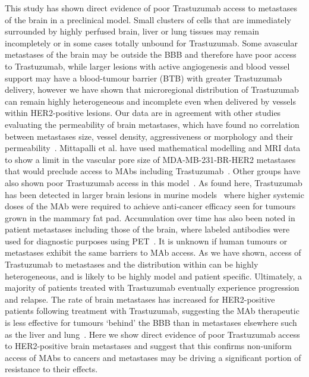 This study has shown direct evidence of poor Trastuzumab access to metastases of the brain in a preclinical model.
Small clusters of cells that are immediately surrounded by highly perfused brain, liver or lung tissues may remain incompletely or in some cases totally unbound for Trastuzumab.
Some avascular metastases of the brain may be outside the \acs{BBB} and therefore have poor access to Trastuzumab, while larger lesions with active angiogenesis and blood vessel support may have a blood-tumour barrier (BTB) with greater Trastuzumab delivery, however we have shown that microregional distribution of Trastuzumab can remain highly heterogeneous and incomplete even when delivered by vessels within \acs{HER2}-positive lesions.
Our data are in agreement with other studies evaluating the permeability of brain metastases, which have found no correlation between metastases size, vessel density, aggressiveness or morphology and their permeability~\cite{Murrell:2015bz,Adkins:2016il}.
Mittapalli et al. have used mathematical modelling and MRI data to show a limit in the vascular pore size of MDA-MB-231-BR-\acs{HER2} metastases that would preclude access to \acs{MAbs} including Trastuzumab~\cite{Mittapalli:2017iu}.
Other groups have also shown poor Trastuzumab access in this model~\cite{Nounou:2016kl,TerrellHall:2017gu}.
As found here, Trastuzumab has been detected in larger brain lesions in murine models~\cite{LewisPhillips:2017jj} where higher systemic doses of the \acs{MAb} were required to achieve anti-cancer efficacy seen for tumours grown in the mammary fat pad.
Accumulation over time has also been noted in patient metastases including those of the brain, where labeled antibodies were used for diagnostic purposes using PET~\cite{Dijkers:2010gc,Kurihara:2015kc}.
It is unknown if human tumours or metastases exhibit the same barriers to \acs{MAb} access.
As we have shown, access of Trastuzumab to metastases and the distribution within can be highly heterogeneous, and is likely to be highly model and patient specific.
Ultimately, a majority of patients treated with Trastuzumab eventually experience progression and relapse.
The rate of brain metastases has increased for \acs{HER2}-positive patients following treatment with Trastuzumab, suggesting the \acs{MAb} therapeutic is less effective for tumours `behind' the \acs{BBB} than in metastases elsewhere such as the liver and lung~\cite{Stemmler:2006}.
Here we show direct evidence of poor Trastuzumab access to \acs{HER2}-positive brain metastases and suggest that this confirms non-uniform access of \acs{MAbs} to cancers and metastases may be driving a significant portion of resistance to their effects.

